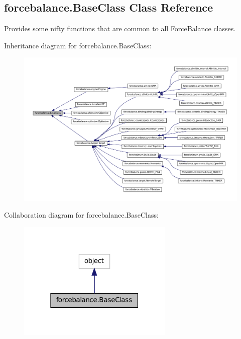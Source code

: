 \hypertarget{classforcebalance_1_1BaseClass}{\subsection{forcebalance.\-Base\-Class Class Reference}
\label{classforcebalance_1_1BaseClass}
}


Provides some nifty functions that are common to all Force\-Balance classes.  




Inheritance diagram for forcebalance.\-Base\-Class\-:\nopagebreak
\begin{figure}[H]
\begin{center}
\leavevmode
\includegraphics[width=350pt]{classforcebalance_1_1BaseClass__inherit__graph}
\end{center}
\end{figure}


Collaboration diagram for forcebalance.\-Base\-Class\-:\nopagebreak
\begin{figure}[H]
\begin{center}
\leavevmode
\includegraphics[width=210pt]{classforcebalance_1_1BaseClass__coll__graph}
\end{center}
\end{figure}
